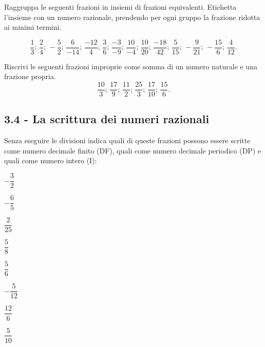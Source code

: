 \begin{esercizio}
 \label{ese:3.17}
Raggruppa le seguenti frazioni in insiemi di frazioni equivalenti.
Etichetta l'insieme con un numero razionale, prendendo per ogni gruppo la frazione ridotta ai minimi termini.

\[\frac{1}{3};\,\frac{2}{4};\,-\frac{5}{2};\,\frac{6}{-14};\,\frac{-12}{4};\,\frac{3}{6};\,\frac{-3}{-9};\,
\frac{10}{-4};\,\frac{10}{20};\,\frac{-18}{42};\,\frac{5}{15};\,-\frac{9}{21};\,-\frac{15}{6};\,\frac{4}{12}.\]
\end{esercizio}

\begin{esercizio}
 \label{ese:3.18}
 Riscrivi le seguenti frazioni improprie come somma di un numero naturale e una frazione propria.
\[\frac{10}{3};\,\frac{17}{9};\,\frac{11}{2};\,\frac{25}{3};\,\frac{17}{10};\,\frac{15}{6}.\]
\end{esercizio}

\subsection*{3.4 - La scrittura dei numeri razionali}

\begin{esercizio}
 \label{ese:3.19}
 Senza eseguire le divisioni indica quali di queste frazioni possono essere scritte come numero decimale
finito (DF), quali come numero decimale periodico (DP)
e quali come numero intero (I):
 \begin{multicols}{2}
 \TabPositions{1cm}
 \begin{enumeratea}
 \item $-\dfrac{3}{2}$ \tab\qquad\boxDF\qquad\boxDP\quad\:\:\boxI\vspace{1.1ex}
 \item $-\dfrac{6}{5}$ \tab\qquad\boxDF\qquad\boxDP\quad\:\:\boxI\vspace{1.1ex}
 \item $\dfrac{2}{25}$ \tab\qquad\boxDF\qquad\boxDP\quad\:\:\boxI\vspace{1.1ex}
 \item $\dfrac{5}{8}$ \tab\qquad\boxDF\qquad\boxDP\quad\:\:\boxI
 \item $\dfrac{5}{6}$ \tab\qquad\boxDF\qquad\boxDP\quad\:\:\boxI\vspace{1.1ex}
 \item $-\dfrac{5}{12}$ \tab\qquad\boxDF\qquad\boxDP\quad\:\:\boxI\vspace{1.1ex}
 \item $\dfrac{12}{6}$ \tab\qquad\boxDF\qquad\boxDP\quad\:\:\boxI\vspace{1.1ex}
 \item $\dfrac{5}{10}$ \tab\qquad\boxDF\qquad\boxDP\quad\:\:\boxI
 \end{enumeratea}
 \end{multicols}
\end{esercizio}

